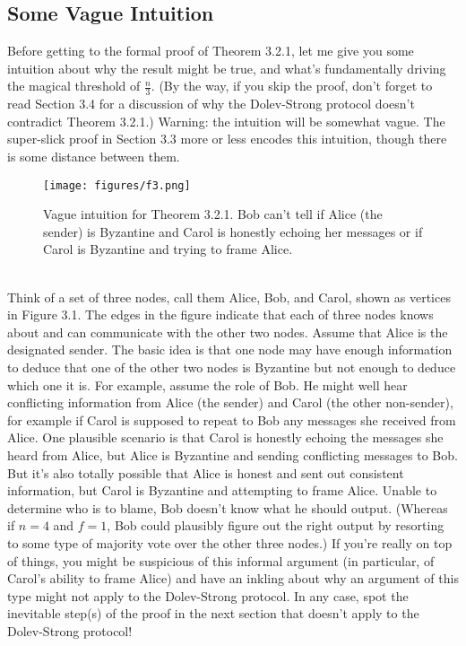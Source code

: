\subsection{Some Vague Intuition}
Before getting to the formal proof of Theorem 3.2.1, let me give you some intuition about
why the result might be true, and what’s fundamentally driving the magical threshold of
$\frac{n}{3}$. (By the way, if you skip the proof, don’t forget to read Section 3.4 for a discussion of
why the Dolev-Strong protocol doesn't contradict Theorem 3.2.1.) Warning: the intuition will
be somewhat vague. The super-slick proof in Section 3.3 more or less encodes this intuition,
though there is some distance between them.\\
\begin{figure}[h]
    \centering
    \texttt{[image: figures/f3.png]}
    \caption{Vague intuition for Theorem 3.2.1. Bob can’t tell if Alice (the sender) is Byzantine
and Carol is honestly echoing her messages or if Carol is Byzantine and trying to frame
Alice.}
    \label{fig:mesh1}
\end{figure}\\
Think of a set of three nodes, call them Alice, Bob, and Carol, shown as vertices in
Figure 3.1. The edges in the figure indicate that each of three nodes knows about and can
communicate with the other two nodes. Assume that Alice is the designated sender.
The basic idea is that one node may have enough information to deduce that one of the
other two nodes is Byzantine but not enough to deduce which one it is. For example, assume
the role of Bob. He might well hear conflicting information from Alice (the sender) and Carol
(the other non-sender), for example if Carol is supposed to repeat to Bob any messages she
received from Alice. One plausible scenario is that Carol is honestly echoing the messages
she heard from Alice, but Alice is Byzantine and sending conflicting messages to Bob. But
it’s also totally possible that Alice is honest and sent out consistent information, but Carol
is Byzantine and attempting to frame Alice. Unable to determine who is to blame, Bob
doesn’t know what he should output. (Whereas if $n = 4$ and $f = 1$, Bob could plausibly
figure out the right output by resorting to some type of majority vote over the other three
nodes.)
If you’re really on top of things, you might be suspicious of this informal argument (in
particular, of Carol’s ability to frame Alice) and have an inkling about why an argument
of this type might not apply to the Dolev-Strong protocol. In any case, spot the inevitable
step(s) of the proof in the next section that doesn’t apply to the Dolev-Strong protocol!

